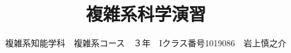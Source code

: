 \documentclass[10pt, a4paper]{jsarticle}
\title{複雑系科学演習} %
\begin{document}
\author{複雑系知能学科　複雑系コース　３年　Iクラス番号1019086　岩上慎之介}
\maketitle %
\newpage




\end{document}
